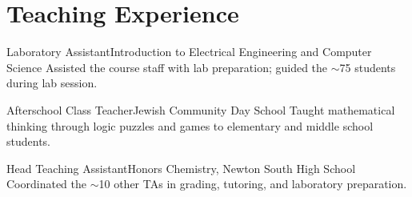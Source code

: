 \documentclass[11pt,letter]{moderncv}
\begin{document}
\vspace*{0.25em}

\vspace*{0.25em}


\section{Teaching Experience}
{Laboratory Assistant}{Introduction to Electrical Engineering and Computer Science}{}{}{
%
Assisted the course staff with lab preparation; guided the $\sim$75 students during lab session.
%
}

{Afterschool Class Teacher}{Jewish Community Day School}{}{}{
%
Taught mathematical thinking through logic puzzles and games to elementary and middle school students.
%
}

{Head Teaching Assistant}{Honors Chemistry, Newton South High School}{}{}{
%
Coordinated the $\sim$10 other TAs in grading, tutoring, and laboratory preparation.
%
}


%
%
%
%
%
\end{document}
